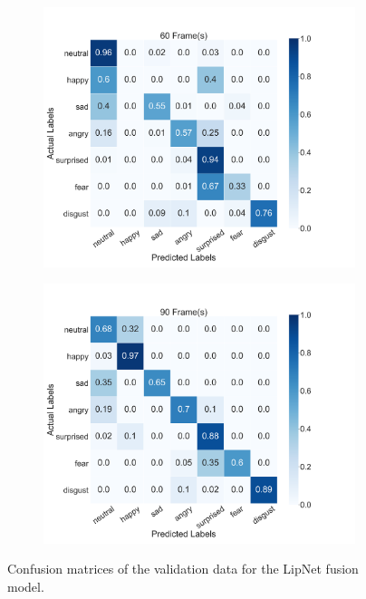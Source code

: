 \begin{figure}
\begin{subfigure}[b]{0.45\textwidth}
      \includegraphics[width=\textwidth]{res/conf_fusion_60.png}
    \end{subfigure}
    \begin{subfigure}[b]{0.45\textwidth}
      \includegraphics[width=\textwidth]{res/conf_fusion_90.png}
    \end{subfigure}
    \caption{Confusion matrices of the validation data for the LipNet fusion model.}
    \label{fig:lipnet_conf}
\end{figure}
